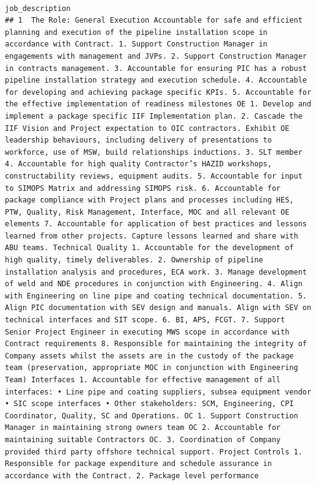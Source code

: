 \documentclass[11pt,a4paper,]{article}
\begin{document}
\begin{verbatim}
                                                                                                                                                                                                                                                                                                                                                                                                                                                                                                                                                                                                                                                                                                                job_description
## 1  The Role: General Execution Accountable for safe and efficient planning and execution of the pipeline installation scope in accordance with Contract. 1. Support Construction Manager in engagements with management and JVPs. 2. Support Construction Manager in contracts management. 3. Accountable for ensuring PIC has a robust pipeline installation strategy and execution schedule. 4. Accountable for developing and achieving package specific KPIs. 5. Accountable for the effective implementation of readiness milestones OE 1. Develop and implement a package specific IIF Implementation plan. 2. Cascade the IIF Vision and Project expectation to OIC contractors. Exhibit OE leadership behaviours, including delivery of presentations to workforce, use of MSW, build relationships inductions. 3. SLT member 4. Accountable for high quality Contractor’s HAZID workshops, constructability reviews, equipment audits. 5. Accountable for input to SIMOPS Matrix and addressing SIMOPS risk. 6. Accountable for package compliance with Project plans and processes including HES, PTW, Quality, Risk Management, Interface, MOC and all relevant OE elements 7. Accountable for application of best practices and lessons learned from other projects. Capture lessons learned and share with ABU teams. Technical Quality 1. Accountable for the development of high quality, timely deliverables. 2. Ownership of pipeline installation analysis and procedures, ECA work. 3. Manage development of weld and NDE procedures in conjunction with Engineering. 4. Align with Engineering on line pipe and coating technical documentation. 5. Align PIC documentation with SEV design and manuals. Align with SEV on technical interfaces and SIT scope. 6. BI, APS, FCGT. 7. Support Senior Project Engineer in executing MWS scope in accordance with Contract requirements 8. Responsible for maintaining the integrity of Company assets whilst the assets are in the custody of the package team (preservation, appropriate MOC in conjunction with Engineering Team) Interfaces 1. Accountable for effective management of all interfaces: • Line pipe and coating suppliers, subsea equipment vendor • SIC scope interfaces • Other stakeholders: SCM, Engineering, CPI Coordinator, Quality, SC and Operations. OC 1. Support Construction Manager in maintaining strong owners team OC 2. Accountable for maintaining suitable Contractors OC. 3. Coordination of Company provided third party offshore technical support. Project Controls 1. Responsible for package expenditure and schedule assurance in accordance with the Contract. 2. Package level performance 
\end{verbatim}
\end{document}
